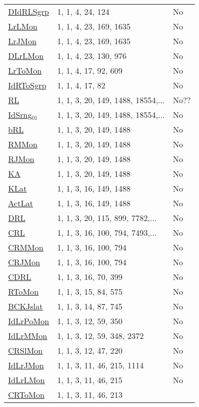 {\begin{tabular}{|l|l|l|}
\hyperlink{DIdRLSgrp}{DIdRLSgrp}& 1, 1, 4, 24, 124 &No\\
\hyperlink{LrLMon}{LrLMon}& 1, 1, 4, 23, 169, 1635 &No\\
\hyperlink{LrJMon}{LrJMon}& 1, 1, 4, 23, 169, 1635 &No\\
\hyperlink{DLrLMon}{DLrLMon}& 1, 1, 4, 23, 130, 976 &No\\
\hyperlink{LrToMon}{LrToMon}& 1, 1, 4, 17, 92, 609 &No\\
\hyperlink{IdRToSgrp}{IdRToSgrp}& 1, 1, 4, 17, 82 &No\\
\hyperlink{RL}{RL}& 1, 1, 3, 20, 149, 1488, 18554,... &No??\\
\hyperlink{IdSrng$_{01}$}{IdSrng$_{01}$}& 1, 1, 3, 20, 149, 1488, 18554,... &No\\
\hyperlink{bRL}{bRL}& 1, 1, 3, 20, 149, 1488 &No\\
\hyperlink{RMMon}{RMMon}& 1, 1, 3, 20, 149, 1488 &No\\
\hyperlink{RJMon}{RJMon}& 1, 1, 3, 20, 149, 1488 &No\\
\hyperlink{KA}{KA}& 1, 1, 3, 20, 149, 1488 &No\\
\hyperlink{KLat}{KLat}& 1, 1, 3, 16, 149, 1488 &No\\
\hyperlink{ActLat}{ActLat}& 1, 1, 3, 16, 149, 1488 &No\\
\hyperlink{DRL}{DRL}& 1, 1, 3, 20, 115, 899, 7782,... &No\\
\hyperlink{CRL}{CRL}& 1, 1, 3, 16, 100, 794, 7493,... &No\\
\hyperlink{CRMMon}{CRMMon}& 1, 1, 3, 16, 100, 794 &No\\
\hyperlink{CRJMon}{CRJMon}& 1, 1, 3, 16, 100, 794 &No\\
\hyperlink{CDRL}{CDRL}& 1, 1, 3, 16, 70, 399 &No\\
\hyperlink{RToMon}{RToMon}& 1, 1, 3, 15, 84, 575 &No\\
\hyperlink{BCKJslat}{BCKJslat}& 1, 1, 3, 14, 87, 745 &No\\
\hyperlink{IdLrPoMon}{IdLrPoMon}& 1, 1, 3, 12, 59, 350 &No\\
\hyperlink{IdLrMMon}{IdLrMMon}& 1, 1, 3, 12, 59, 348, 2372 &No\\
\hyperlink{CRSlMon}{CRSlMon}& 1, 1, 3, 12, 47, 220 &No\\
\hyperlink{IdLrJMon}{IdLrJMon}& 1, 1, 3, 11, 46, 215, 1114 &No\\
\hyperlink{IdLrLMon}{IdLrLMon}& 1, 1, 3, 11, 46, 215 &No\\
\hyperlink{CRToMon}{CRToMon}& 1, 1, 3, 11, 46, 213 &\\

\end{tabular}}
